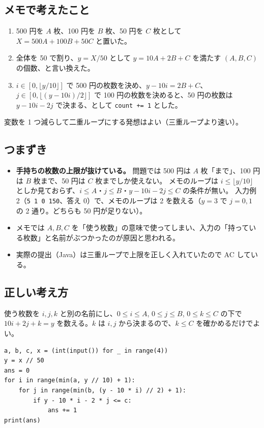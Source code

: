 \documentclass[a4paper]{article}
\begin{document}
\subsection*{メモで考えたこと}
\begin{enumerate}
  \item 500 円を $A$ 枚、100 円を $B$ 枚、50 円を $C$ 枚として $X = 500A + 100B + 50C$ と置いた。
  \item 全体を 50 で割り、$y = X/50$ として $y = 10A + 2B + C$ を満たす $(A,B,C)$ の個数、と言い換えた。
  \item $i \in [0, \lfloor y/10 \rfloor]$ で 500 円の枚数を決め、$y - 10i = 2B + C$、
    $j \in [0, \lfloor (y-10i)/2 \rfloor]$ で 100 円の枚数を決めると、50 円の枚数は $y - 10i - 2j$ で決まる、として \verb|count += 1| とした。
\end{enumerate}

\noindent 変数を 1 つ減らして二重ループにする発想はよい（三重ループより速い）。

\subsection*{つまずき}
\begin{itemize}
  \item \textbf{手持ちの枚数の上限が抜けている。} 問題では 500 円は $A$ 枚「まで」、100 円は $B$ 枚まで、50 円は $C$ 枚までしか使えない。
    メモのループは $i \leq \lfloor y/10 \rfloor$ としか見ておらず、$i \leq A$・$j \leq B$・$y-10i-2j \leq C$ の条件が無い。
    入力例 2（\mbox{\texttt{5 1 0 150}}、答え 0）で、メモのループは 2 を数える（$y=3$ で $j=0,1$ の 2 通り。どちらも 50 円が足りない）。
  \item メモでは $A, B, C$ を「使う枚数」の意味で使ってしまい、入力の「持っている枚数」と名前がぶつかったのが原因と思われる。
  \item 実際の提出（Java）は三重ループで上限を正しく入れていたので AC している。
\end{itemize}

\subsection*{正しい考え方}
使う枚数を $i, j, k$ と別の名前にし、$0 \leq i \leq A$, $0 \leq j \leq B$, $0 \leq k \leq C$ の下で
$10i + 2j + k = y$ を数える。$k$ は $i, j$ から決まるので、$k \leq C$ を確かめるだけでよい。

\begin{verbatim}
a, b, c, x = (int(input()) for _ in range(4))
y = x // 50
ans = 0
for i in range(min(a, y // 10) + 1):
    for j in range(min(b, (y - 10 * i) // 2) + 1):
        if y - 10 * i - 2 * j <= c:
            ans += 1
print(ans)
\end{verbatim}
\end{document}
